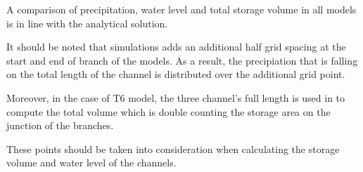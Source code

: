 A comparison of precipitation, water level and total storage volume in all models is in line with the analytical solution.

It should be noted that \dflowfm simulations adds an additional half grid spacing at the start and end of branch of the models.
As a result, the precipiation that is falling on the total length of the channel is distributed over the additional grid point. 

Moreover, in the case of T6 model, the three channel's full length is used in \dflowfm to compute the total volume which is double counting the storage area on the junction of the branches. 

These points should be taken into consideration when calculating the storage volume and  water level of the channels.

\printrefsegment
